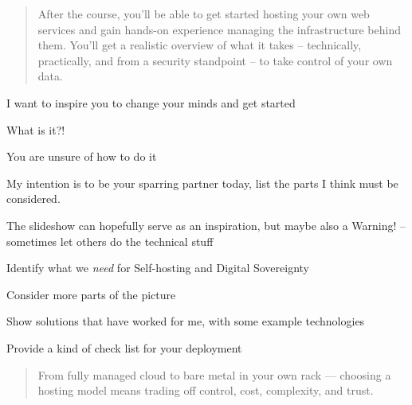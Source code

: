 \documentclass[Screen16to9,17pt]{foils}
\begin{document}

\begin{quote}
After the course, you'll be able to get started hosting your own web services and gain hands-on experience managing the infrastructure behind them. You'll get a realistic overview of what it takes -- technically, practically, and from a security standpoint -- to take control of your own data.
\end{quote}

I want to inspire you to change your minds and get started
\begin{list2}
\item What is it?!
\item You are unsure of how to do it
\item My intention is to be your sparring partner today, list the parts I think must be considered.

\item The slideshow can hopefully serve as an inspiration, but maybe also a Warning! -- sometimes let others do the technical stuff \smiley
\end{list2}



\begin{list2}
\item Identify what we \emph{need} for Self-hosting and Digital Sovereignty
\item Consider more parts of the picture
\item Show solutions that have worked for me, with some example technologies
\item Provide a kind of check list for your deployment
\end{list2}



\begin{quote}
From fully managed cloud to bare metal in your own rack —
choosing a hosting model means trading off control, cost, complexity, and trust.
\end{quote}
\end{document}
